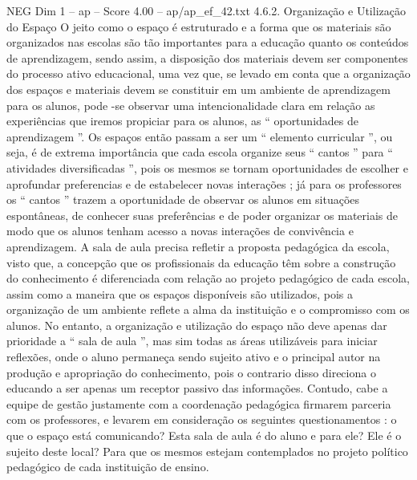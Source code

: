 \begin{textsample}{NEG Dim 1 – ap – Score 4.00 – ap/ap\_ef\_42.txt}  \label{ex:f1_neg_129}
4.6.2.
Organização e Utilização do Espaço O jeito como o espaço é estruturado e a forma que os materiais são organizados nas escolas são tão importantes para a educação quanto os conteúdos de aprendizagem, sendo assim, a disposição dos materiais devem ser componentes do processo ativo educacional, uma vez que, se levado em conta que a organização dos espaços e materiais devem se constituir em um ambiente de aprendizagem para os alunos, pode -se observar uma intencionalidade clara em relação as experiências que iremos propiciar para os alunos, as “ oportunidades de aprendizagem ”.
Os espaços então passam a ser um “ elemento curricular ”, ou seja, é de extrema importância que cada escola organize seus “ cantos ” para “ atividades diversificadas ”, pois os mesmos se tornam oportunidades de escolher e aprofundar preferencias e de estabelecer novas interações ; já para os professores os “ cantos ” trazem a oportunidade de observar os alunos em situações espontâneas, de conhecer suas preferências e de poder organizar os materiais de modo que os alunos tenham acesso a novas interações de convivência e aprendizagem.
A sala de aula precisa refletir a proposta pedagógica da escola, visto que, a concepção que os profissionais da educação têm sobre a construção do conhecimento é diferenciada com relação ao projeto pedagógico de cada escola, assim como a maneira que os espaços disponíveis são utilizados, pois a organização de um ambiente reflete a alma da instituição e o compromisso com os alunos.
No entanto, a organização e utilização do espaço não deve apenas dar prioridade a “ sala de aula ”, mas sim todas as áreas utilizáveis para iniciar reflexões, onde o aluno permaneça sendo sujeito ativo e o principal autor na produção e apropriação do conhecimento, pois o contrario disso direciona o educando a ser apenas um receptor passivo das informações.
Contudo, cabe a equipe de gestão justamente com a coordenação pedagógica firmarem parceria com os professores, e levarem em consideração os seguintes questionamentos : o que o espaço está comunicando?
Esta sala de aula é do aluno e para ele?
Ele é o sujeito deste local?
Para que os mesmos estejam contemplados no projeto político pedagógico de cada instituição de ensino.

\end{textsample}
